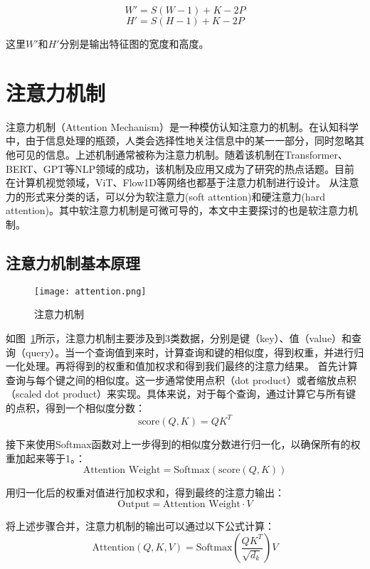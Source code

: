 \[ W' = S(W-1) + K - 2P \]
\[ H' = S(H-1) + K - 2P \]

这里\(W'\)和\(H'\)分别是输出特征图的宽度和高度。

\section{注意力机制}
注意力机制（Attention Mechanism）是一种模仿认知注意力的机制。在认知科学中，由于信息处理的瓶颈，人类会选择性地关注信息中的某一一部分，同时忽略其他可见的信息。上述机制通常被称为注意力机制。随着该机制在Transformer、BERT、GPT等NLP领域的成功，该机制及应用又成为了研究的热点话题。目前在计算机视觉领域，ViT、Flow1D等网络也都基于注意力机制进行设计。
从注意力的形式来分类的话，可以分为软注意力(soft attention)和硬注意力(hard attention)。其中软注意力机制是可微可导的，本文中主要探讨的也是软注意力机制。

\subsection{注意力机制基本原理}

\begin{figure}[h]
  \centering
  \texttt{[image: attention.png]}
  \caption{注意力机制}
  \label{fig:attention}
\end{figure}

如图~\ref{fig:attention}所示，注意力机制主要涉及到3类数据，分别是键（key）、值（value）和查询（query）。当一个查询值到来时，计算查询和键的相似度，得到权重，并进行归一化处理。再将得到的权重和值加权求和得到我们最终的注意力结果。
首先计算查询与每个键之间的相似度。这一步通常使用点积（dot product）或者缩放点积（scaled dot product）来实现。具体来说，对于每个查询，通过计算它与所有键的点积，得到一个相似度分数：
\begin{equation}
  \text{score}(Q, K) = QK^T 
\end{equation}

接下来使用Softmax函数对上一步得到的相似度分数进行归一化，以确保所有的权重加起来等于1。：
\begin{equation}
   \text{Attention Weight} = \text{Softmax}(\text{score}(Q, K))
\end{equation}

用归一化后的权重对值进行加权求和，得到最终的注意力输出：
\begin{equation}
  \text{Output} = \text{Attention Weight} \cdot V 
\end{equation}

将上述步骤合并，注意力机制的输出可以通过以下公式计算：
\begin{equation}
\text{Attention}(Q, K, V) = \text{Softmax}\left(\frac{QK^T}{\sqrt{d_k}}\right)V 
\end{equation}

